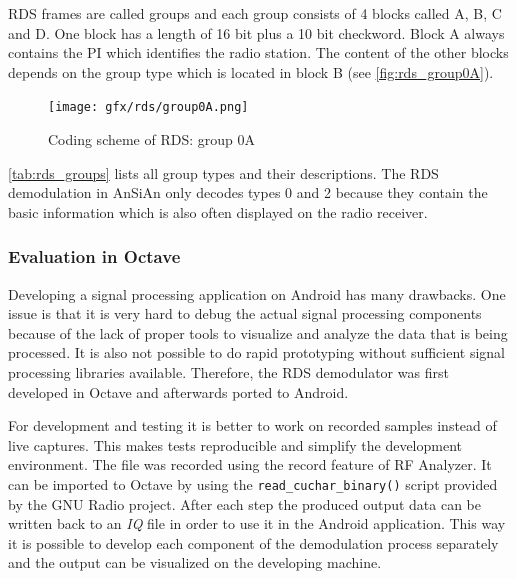 RDS frames are called groups and each group consists of 4 blocks called
A, B, C and D. One block has a length of 16 bit plus a 10 bit checkword.
Block A always contains the \ac{PI} which identifies the radio station.
The content of the other blocks depends on the group type which is located
in block B (see \autoref{fig:rds_group0A}).

\begin{figure}
	\centering
	\texttt{[image: gfx/rds/group0A.png]}
	\caption[Coding scheme of RDS: group 0A]{Coding scheme of RDS: group 0A \cite{1999:iec62106}}
	\label{fig:rds_group0A}
\end{figure}

\autoref{tab:rds_groups} lists all group types and their descriptions.
The \ac{RDS} demodulation in AnSiAn only decodes types 0 and 2 because they contain
the basic information which is also often displayed on the radio
receiver.


\subsubsection{Evaluation in Octave}

Developing a signal processing application on Android has many drawbacks. One
issue is that it is very hard to debug the actual signal processing components
because of the lack of proper tools to visualize and analyze the data that is
being processed. It is also not possible to do rapid prototyping without
sufficient signal processing libraries available. Therefore, the \ac{RDS}
demodulator was first developed in Octave and afterwards ported to Android.

For development and testing it is better to work on recorded samples instead
of live captures. This makes tests reproducible and simplify the development
environment. The file was recorded using the record feature of RF Analyzer. It
can be imported to Octave by using the \texttt{read\_cuchar\_binary()} script
provided by the GNU Radio project. After each step the produced output data
can be written back to an \emph{IQ} file in order to use it in the Android application.
This way it is possible to develop each component of the demodulation process
separately and the output can be visualized on the developing machine.

